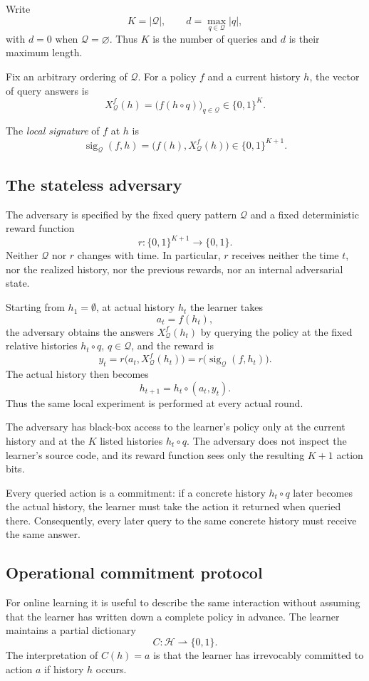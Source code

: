 \documentclass[11pt]{article}
\newcommand{\Hh}{\mathcal H}
\newcommand{\QQ}{\mathcal Q}
\newcommand{\sig}{\operatorname{sig}}
\begin{document}
Write
\[
    K=|\QQ|,
    \qquad
    d=\max_{q\in\QQ}|q|,
\]
with $d=0$ when $\QQ=\varnothing$.  Thus $K$ is the number of queries and $d$ is their maximum length.

Fix an arbitrary ordering of $\QQ$.
For a policy $f$ and a current history $h$, the vector of query answers is
\[
    X^f_{\QQ}(h)
    =\bigl(f(h\circ q)\bigr)_{q\in\QQ}
    \in\{0,1\}^{K}.
\]

The \emph{local signature} of $f$ at $h$ is
\[
    \sig_{\QQ}(f,h)
    =\bigl(f(h),X^f_{\QQ}(h)\bigr)
    \in\{0,1\}^{K+1}.
\]

\subsection{The stateless adversary}

The adversary is specified by the fixed query pattern $\QQ$ and a fixed deterministic reward function
\[
    r:\{0,1\}^{K+1}\to\{0,1\}.
\]
Neither $\QQ$ nor $r$ changes with time.  In particular, $r$ receives neither the time $t$, nor the realized history, nor the previous rewards, nor an internal adversarial state.

Starting from $h_1=\emptyset$, at actual history $h_t$ the learner takes
\[
    a_t=f(h_t),
\]
the adversary obtains the answers $X^f_{\QQ}(h_t)$ by querying the policy at the fixed relative histories $h_t\circ q$, $q\in\QQ$, and the reward is
\[
    y_t=r\bigl(a_t,X^f_{\QQ}(h_t)\bigr)
       =r\bigl(\sig_{\QQ}(f,h_t)\bigr).
\]
The actual history then becomes
\[
    h_{t+1}=h_t\circ(a_t,y_t).
\]
Thus the same local experiment is performed at every actual round.

The adversary has black-box access to the learner's policy only at the current history and at the $K$ listed histories $h_t\circ q$.  The adversary does not inspect the learner's source code, and its reward function sees only the resulting $K+1$ action bits.

Every queried action is a commitment: if a concrete history $h_t\circ q$ later becomes the actual history, the learner must take the action it returned when queried there.  Consequently, every later query to the same concrete history must receive the same answer.

\subsection{Operational commitment protocol}

For online learning it is useful to describe the same interaction without assuming that the learner has written down a complete policy in advance.  The learner maintains a partial dictionary
\[
    C:\Hh\rightharpoonup\{0,1\}.
\]
The interpretation of $C(h)=a$ is that the learner has irrevocably committed to action $a$ if history $h$ occurs.
\end{document}
